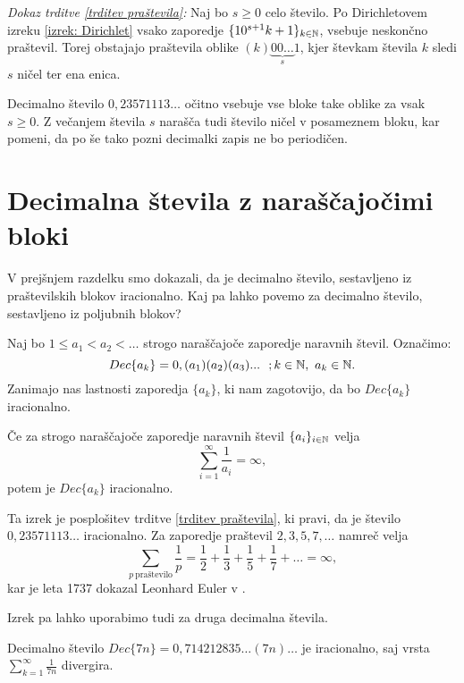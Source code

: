 \documentclass[twoside,11pt]{article}
\begin{document}
\noindent
{\em Dokaz trditve \ref{trditev praštevila}:\/} Naj bo $s \geq 0$ celo število. 
Po Dirichletovem izreku \ref{izrek: Dirichlet} vsako zaporedje
$ \{10^{s+1}k + 1\}_{k \in \mathbb{N}}$,  vsebuje neskončno praštevil. Torej obstajajo praštevila
oblike $(k)\underbrace{00 \dots}_{s}1$, kjer števkam števila $k$ sledi $s$ ničel ter ena enica. 

Decimalno število $0,23571113\dots$ očitno vsebuje vse bloke take oblike za vsak $s \geq 0$. Z večanjem števila
$s$ narašča tudi število ničel v posameznem bloku, kar pomeni, da po še tako pozni decimalki zapis ne bo periodičen.

\QED


\section{Decimalna števila z naraščajočimi bloki}

V prejšnjem razdelku smo dokazali, da je decimalno število, sestavljeno iz praštevilskih
blokov iracionalno. Kaj pa lahko povemo za decimalno število, sestavljeno iz poljubnih blokov?

Naj bo $1 \leq a_1 < a_2 < \dots $ strogo naraščajoče zaporedje naravnih števil. 
Označimo: \[Dec\{a_k\} = 0,(a_1)(a_2)(a_3)... \  \ ; k \in \mathbb{N}, \ a_k \in \mathbb{N} . \]
Zanimajo nas lastnosti zaporedja $\{a_k\}$, ki nam zagotovijo, da bo $Dec\{a_k\}$ iracionalno.

\begin{izrek}\label{irac1}
    
    Če za strogo naraščajoče zaporedje naravnih števil $\{a_i\}_{i \in \mathbb{N}}$ velja 
    \[ \sum_{i=1}^{\infty} \frac{1}{a_i} = \infty ,\]
    potem je $Dec\{a_k\}$ iracionalno.
\end{izrek}

Ta izrek je posplošitev trditve \ref{trditev praštevila}, ki pravi, da je število $0,23571113 \dots$
iracionalno. Za zaporedje praštevil $2, 3, 5, 7, \dots$ namreč velja
\[
    \sum_{p \ \text{praštevilo}}\frac{1}{p} = \frac{1}{2} + \frac{1}{3} + \frac{1}{5} + \frac{1}{7} + \dots = \infty ,\]
kar je leta 1737 dokazal Leonhard Euler v \cite{Eul}.

Izrek pa lahko uporabimo tudi za druga decimalna števila.

\begin{zgled}
    Decimalno število $Dec\{7n\} = 0,714212835\dots (7n) \dots$ je iracionalno, saj
    vrsta $\sum_{k=1}^{\infty}\frac{1}{7n} $ divergira.
\end{zgled}
\end{document}
